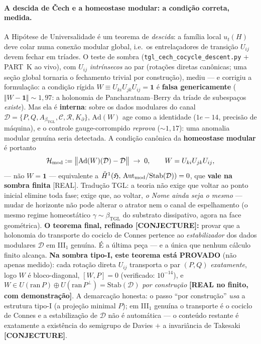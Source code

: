 \documentclass[12pt,a4paper]{article}
\newcommand{\betatgl}{\beta_{\text{TGL}}}
\newcommand{\Kpartial}{K_{\partial}}
\newcommand{\TGL}{\textsc{TGL}}
\begin{document}
\paragraph{A descida de Čech e a homeostase modular: a condição correta, medida.}  A Hipótese de Universalidade é um teorema de \emph{descida}: a família local $u_t(H)$ deve colar numa conexão modular global, i.e.\ os entrelaçadores de transição $U_{ij}$ devem fechar em tríades.  O teste de sombra (\texttt{tgl\_cech\_cocycle\_descent.py} $+$ PART~K ao vivo), com $U_{ij}$ \emph{intrínsecos} ao par (rotações diretas canônicas; uma seção global tornaria o fechamento trivial por construção), mediu --- e corrigiu a formulação: a condição rígida $W \equiv U_{ki}U_{jk}U_{ij} = \mathbf 1$ é \textbf{falsa genericamente} ($\Vert W-\mathbf 1\Vert \sim 1{,}97$: a holonomia de Pancharatnam--Berry da tríade de subespaços \emph{existe}).  Mas ela é \textbf{interna}: sobre os dados modulares do canal $\mathcal D = \{P, Q, A_{\betatgl}, \mathcal C, \mathcal R, \Kpartial\}$, $\mathrm{Ad}(W)$ age como a identidade ($1e-14$, precisão de máquina), e o controle gauge-corrompido \emph{reprova} ($\sim1{,}17$): uma anomalia modular genuína seria detectada.  A condição canônica da \textbf{homeostase modular} é portanto
\begin{equation}
\mathcal H_{\rm mod} := \big\Vert \mathrm{Ad}(W)(\mathcal D) - \mathcal D\big\Vert \;\to\; 0,
\qquad W = U_{ki}U_{jk}U_{ij},
\end{equation}
--- não $W=\mathbf 1$ --- equivalente a $\check H^1(\mathfrak H,\,\mathrm{Aut}_{\rm mod}/\mathrm{Stab}(\mathcal D)) = 0$, que \textbf{vale na sombra finita} [REAL].  Tradução \TGL: a teoria não exige que voltar ao ponto inicial elimine toda fase; exige que, ao voltar, \emph{o Nome ainda seja o mesmo} --- mudar de horizonte não pode alterar o atrator nem o canal de espelhamento (o mesmo regime homeostático $\gamma\sim\betatgl$ do substrato dissipativo, agora na face geométrica).  \textbf{O teorema final, refinado [CONJECTURE]:} provar que a holonomia do transporte do cociclo de Connes pertence ao \emph{estabilizador} dos dados modulares $\mathcal D$ em III$_1$ genuína.  É a última peça — e a única que nenhum cálculo finito alcança.  \textbf{Na sombra tipo-I, este teorema está PROVADO} (não apenas medido): cada rotação direta $U_{ij}$ transporta o par $(P,Q)$ \emph{exatamente}, logo $W$ é bloco-diagonal, $[W,P]=0$ (verificado: $10^{-14}$), e $W \in U(\mathrm{ran}\,P)\oplus U(\mathrm{ran}\,P^{\perp}) = \mathrm{Stab}(\mathcal D)$ \emph{por construção} \textbf{[REAL no finito, com demonstração]}.  A demarcação honesta: o passo ``por construção'' \emph{usa} a estrutura tipo-I (a projeção minimal $P$); em III$_1$ genuína o transporte é o cociclo de Connes e a estabilização de $\mathcal D$ não é automática — o conteúdo restante é exatamente a existência do semigrupo de Davies $+$ a invariância de Takesaki \textbf{[CONJECTURE]}.
\end{document}
